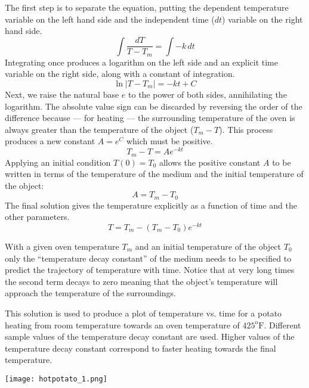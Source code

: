 \documentclass{ximera}
\begin{document}
The first step is to separate the equation, putting the dependent temperature variable on the left hand side and the independent time ($dt$)  variable on the right hand side.
\[
\int\frac{dT}{T-T_m}=\int -k\,dt
\]
Integrating once produces a logarithm on the left side and an explicit time variable on the right side, along with a constant of integration.
\[
\ln|T-T_m|=-kt+C
\]
Next, we raise the natural base $e$ to the power of both sides, annihilating the logarithm.  The absolute value sign can be discarded by reversing the order of the difference because --- for heating --- the surrounding temperature of the oven is always greater than the temperature of the object ($T_m-T$). This process produces a new constant $A=e^C$ which must be positive.
\[
T_m-T=Ae^{-kt}
\]
Applying an initial condition $T(0)=T_0$ allows the positive constant $A$ to be written in terms of the temperature of the medium and the initial temperature of the object:
\[
A=T_m-T_0
\]
The final solution gives the temperature explicitly as a function of time and the other parameters.
\[
T=T_m-(T_m-T_0)e^{-kt}
\]
 
With a given oven temperature $T_m$ and an initial temperature of the object $T_0$ only the ``temperature decay constant'' of the medium  needs to be specified to predict the trajectory of temperature with time.  Notice that at very long times the second term decays to zero meaning that the object's temperature will approach the temperature of the surroundings.
 
This solution is used to produce a plot of temperature vs. time for a potato heating from room temperature towards an oven temperature of $425^{\text{o}}\text{F}$.  Different sample values of the temperature decay constant  are used.  Higher values of the temperature decay constant correspond to faster heating towards the final temperature.
 
\begin{image}
\texttt{[image: hotpotato\_1.png]}
\end{image}
 
\end{document}
